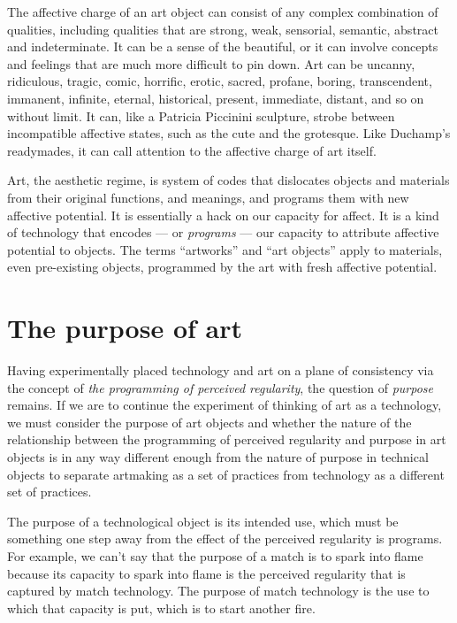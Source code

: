 \documentclass[letterpaper]{article}
\begin{document}
    The affective charge of an art object can consist of any complex combination of qualities, including qualities that are strong, weak, sensorial, semantic, abstract and indeterminate. It can be a sense of the beautiful, or it can involve concepts and feelings that are much more difficult to pin down. Art can be uncanny, ridiculous, tragic, comic, horrific, erotic, sacred, profane, boring, transcendent, immanent, infinite, eternal, historical, present, immediate, distant, and so on without limit. It can, like a Patricia Piccinini sculpture, strobe between incompatible affective states, such as the cute and the grotesque. Like Duchamp's readymades, it can call attention to the affective charge of art itself.

    Art, the aesthetic regime, is system of codes that dislocates objects and materials from their original functions, and meanings, and programs them with new affective potential. It is essentially a hack on our capacity for affect. It is a kind of technology that encodes — or \emph{programs} — our capacity to attribute affective potential to objects. The terms “artworks” and “art objects” apply to materials, even pre-existing objects, programmed by the art with fresh affective potential.
    
\section{The purpose of art}

    Having experimentally placed technology and art on a plane of consistency via the concept of \emph{the programming of perceived regularity}, the question of \emph{purpose} remains. If we are to continue the experiment of thinking of art as a technology, we must consider the purpose of art objects and whether the nature of the relationship between the programming of perceived regularity and purpose in art objects is in any way different enough from the nature of purpose in technical objects to separate artmaking as a set of practices from technology as a different set of practices.
    
    The purpose of a technological object is its intended use, which must be something one step away from the effect of the perceived regularity is programs. For example, we can't say that the purpose of a match is to spark into flame because its capacity to spark into flame is the perceived regularity that is captured by match technology. The purpose of match technology is the use to which that capacity is put, which is to start another fire. 
    
\end{document}
